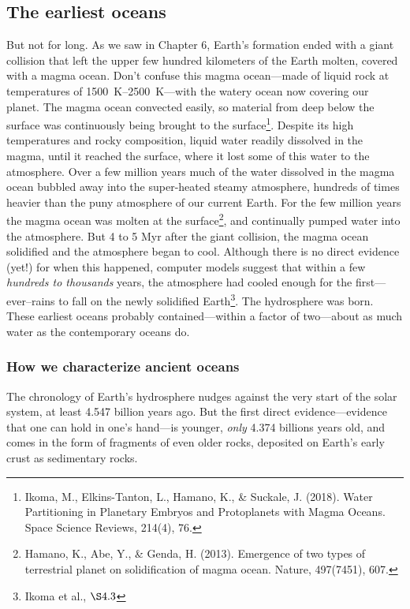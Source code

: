 \documentclass[amstex,12pt]{book}
\begin{document}
{\subsection{The earliest oceans}
But not for long. As we saw in Chapter 6, Earth's formation ended with a giant collision that left the upper few hundred kilometers of the Earth molten, covered with a magma ocean. Don't confuse this magma ocean---made of liquid rock at temperatures of \SIrange{1500}{2500}{\kelvin}---with the watery ocean now covering our planet. The magma ocean convected easily, so material from deep below the surface was continuously being brought to the surface\footnote{Ikoma, M., Elkins-Tanton, L., Hamano, K., \& Suckale, J. (2018). Water Partitioning in Planetary Embryos and Protoplanets with Magma Oceans. Space Science Reviews, 214(4), 76.}. Despite its high temperatures and rocky composition, liquid water readily dissolved in the magma, until it reached the surface, where it lost some of this water to the atmosphere. Over a few million years much of the water dissolved in the magma ocean bubbled away into the super-heated steamy atmosphere, hundreds of times heavier than the puny atmosphere of our current Earth. For the few million years the magma ocean was molten at the surface\footnote{Hamano, K., Abe, Y., \& Genda, H. (2013). Emergence of two types of terrestrial planet on solidification of magma ocean. Nature, 497(7451), 607.}, and continually pumped water into the atmosphere. But 4 to 5 Myr after the giant collision, the magma ocean solidified and the atmosphere began to cool. Although there is no direct evidence (yet!) for when this happened, computer models suggest that within a few \emph{hundreds to thousands} years, the atmosphere had cooled enough for the first---ever--rains to fall on the newly solidified Earth\footnote{Ikoma et al., $\S 4.3$}. The hydrosphere was born. These earliest oceans probably contained---within a factor of two---about as much water as the contemporary oceans do.
\subsubsection{How we characterize ancient oceans}
The chronology of Earth's hydrosphere nudges against the very start of the solar system, at least 4.547 billion years ago. But the first direct evidence---evidence that one can hold in one's hand---is younger, \emph{only} 4.374 billions years old, and comes in the form of fragments of even older rocks, deposited on Earth's early crust as sedimentary rocks.
}
\end{document}
